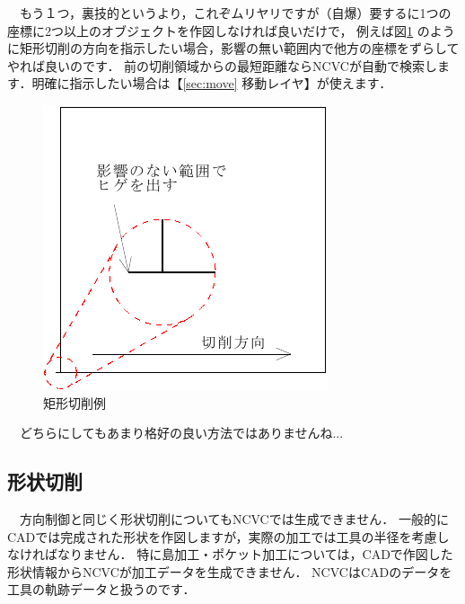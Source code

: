 \vspace*{2zh}
\begin{minipage}[t]{0.6\textwidth}
　もう１つ，裏技的というより，これぞムリヤリですが（自爆）要するに1つの座標に2つ以上のオブジェクトを作図しなければ良いだけで，
例えば図\ref{fig:direction2} のように矩形切削の方向を指示したい場合，影響の無い範囲内で他方の座標をずらしてやれば良いのです．
前の切削領域からの最短距離ならNCVCが自動で検索します．明確に指示したい場合は【\ref{sec:move} 移動レイヤ】が使えます．
\end{minipage}
\begin{minipage}[t]{0.4\textwidth}
\vspace*{-2zh}
\begin{figure}[H]
\centering
\includegraphics[width=\textwidth]{No4/fig/direction2-crop.pdf}
\caption{矩形切削例}
\label{fig:direction2}
\end{figure}
\end{minipage}

\vspace*{2zh}
　どちらにしてもあまり格好の良い方法ではありませんね...

\subsection{形状切削}
　方向制御と同じく形状切削についてもNCVCでは生成できません．
一般的にCADでは完成された形状を作図しますが，実際の加工では工具の半径を考慮しなければなりません．
特に島加工・ポケット加工については，CADで作図した形状情報からNCVCが加工データを生成できません．
NCVCはCADのデータを工具の軌跡データと扱うのです．

